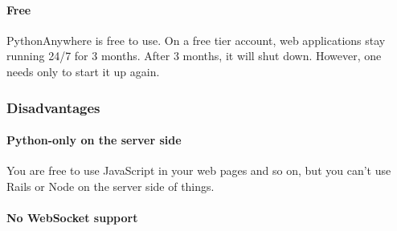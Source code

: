 \paragraph{Free}
PythonAnywhere is free to use. On a free tier account, web applications stay running 24/7 for 3 months. After 3 months, it will shut down. However, one needs only to start it up again.

\subsubsection{Disadvantages}

\paragraph{Python-only on the server side}
You are free to use JavaScript in your web pages and so on, but you can't use Rails or Node on the server side of things.

\paragraph{No WebSocket support}
